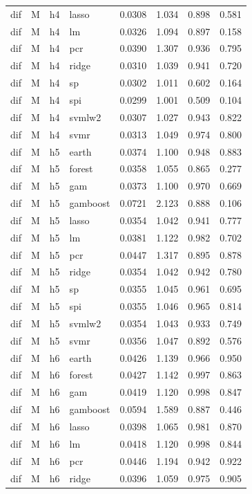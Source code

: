 \begin{ThreePartTable}
\begin{longtable}[t]{llclcccc}
dif & M & h4 & lasso & 0.0308 & 1.034 & 0.898 & 0.581\\
dif & M & h4 & lm & 0.0326 & 1.094 & 0.897 & 0.158\\
dif & M & h4 & pcr & 0.0390 & 1.307 & 0.936 & 0.795\\
dif & M & h4 & ridge & 0.0310 & 1.039 & 0.941 & 0.720\\
dif & M & h4 & sp & 0.0302 & 1.011 & 0.602 & 0.164\\
dif & M & h4 & spi & 0.0299 & 1.001 & 0.509 & 0.104\\
dif & M & h4 & svmlw2 & 0.0307 & 1.027 & 0.943 & 0.822\\
dif & M & h4 & svmr & 0.0313 & 1.049 & 0.974 & 0.800\\
\addlinespace
dif & M & h5 & earth & 0.0374 & 1.100 & 0.948 & 0.883\\
dif & M & h5 & forest & 0.0358 & 1.055 & 0.865 & 0.277\\
dif & M & h5 & gam & 0.0373 & 1.100 & 0.970 & 0.669\\
dif & M & h5 & gamboost & 0.0721 & 2.123 & 0.888 & 0.106\\
dif & M & h5 & lasso & 0.0354 & 1.042 & 0.941 & 0.777\\
dif & M & h5 & lm & 0.0381 & 1.122 & 0.982 & 0.702\\
dif & M & h5 & pcr & 0.0447 & 1.317 & 0.895 & 0.878\\
dif & M & h5 & ridge & 0.0354 & 1.042 & 0.942 & 0.780\\
dif & M & h5 & sp & 0.0355 & 1.045 & 0.961 & 0.695\\
dif & M & h5 & spi & 0.0355 & 1.046 & 0.965 & 0.814\\
dif & M & h5 & svmlw2 & 0.0354 & 1.043 & 0.933 & 0.749\\
dif & M & h5 & svmr & 0.0356 & 1.047 & 0.892 & 0.576\\
\addlinespace
dif & M & h6 & earth & 0.0426 & 1.139 & 0.966 & 0.950\\
dif & M & h6 & forest & 0.0427 & 1.142 & 0.997 & 0.863\\
dif & M & h6 & gam & 0.0419 & 1.120 & 0.998 & 0.847\\
dif & M & h6 & gamboost & 0.0594 & 1.589 & 0.887 & 0.446\\
dif & M & h6 & lasso & 0.0398 & 1.065 & 0.981 & 0.870\\
dif & M & h6 & lm & 0.0418 & 1.120 & 0.998 & 0.844\\
dif & M & h6 & pcr & 0.0446 & 1.194 & 0.942 & 0.922\\
dif & M & h6 & ridge & 0.0396 & 1.059 & 0.975 & 0.905\\

\end{longtable}
\end{ThreePartTable}
